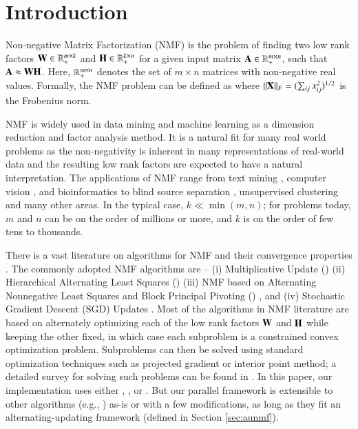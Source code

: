 \section{Introduction}

Non-negative Matrix Factorization (NMF) is the problem of finding two low rank factors $\mathbf{W}\in \mathbb{R}_+^{m\times k}$ and $\mathbf{H}\in \mathbb{R}_+^{k \times n}$ for a given input matrix  $\mathbf{A}\in \mathbb{R}_+^{m\times n}$, such that $\mathbf{A} \approx \mathbf{W} \mathbf{H}$.
Here, $\mathbb{R}_+^{m\times n}$ denotes the set of $m \times n$ matrices with non-negative real values.
Formally, the NMF problem \cite{seung2001algorithms} can be defined as 
where $\|\mathbf{X}\|_F=(\sum_{ij} x_{ij}^2)^{1/2}$ is the Frobenius norm.

NMF is widely used in data mining and machine learning as a dimension reduction and factor analysis method. 
It is a natural fit for many real world problems as the non-negativity is inherent in many representations of real-world data and
the resulting low rank factors are expected to have a natural interpretation. The applications of NMF range from text mining \cite{pauca2004text},  computer vision \cite{hoyer2004non,Fujimoto2014,BSJJZ2015}, and bioinformatics \cite{kim2007sparse} to blind source separation  \cite{cichocki2009nonnegative}, unsupervised clustering \cite{kuang2012symmetric,kuang2013symnmf}  and many other areas.
In the typical case, $k \ll \min(m,n)$; for problems today, $m$ and $n$ can be on the order of millions or more, and $k$ is on the order of few tens to thousands.

There is a vast literature
on algorithms for NMF and their convergence properties \cite{kim2013nonnegative}.   
The commonly adopted NMF algorithms are -- (i) Multiplicative Update (\MU) \cite{seung2001algorithms} (ii) Hierarchical Alternating Least Squares (\HALS) \cite{cichocki2009nonnegative,Ho2008} (iii) NMF based on Alternating Nonnegative Least Squares and Block Principal Pivoting (\BPP) \cite{kim2011fast}, and (iv) Stochastic Gradient Descent (SGD) Updates \cite{gemulla2011large}. 
Most of the algorithms in NMF literature are based on alternately optimizing each of the low rank factors $\mathbf{W}$ and $\mathbf{H}$ while keeping the other fixed, in which case each subproblem is a constrained convex optimization problem. 
Subproblems can then be solved using standard optimization techniques such as projected gradient or interior point method; a detailed survey for solving such problems can be found in \cite{xiong2013survey,kim2013nonnegative}. 
In this paper, our implementation uses either \BPP, \MU, or \HALS. 
But our parallel framework is extensible to other algorithms (e.g., \cite{XY2013,HSL2016}) as-is or with a few modifications, as long as they fit an alternating-updating framework (defined in Section \ref{sec:aunmf}).  

